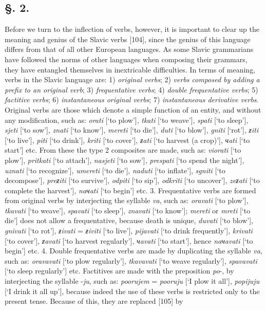 \subsection*{\hspace*{\fill}§. 2.\hspace*{\fill}}

Before we turn to the inflection of verbs, however, it is important to clear up the meaning and genius of the Slavic verbs [104], since the genius of this language differs from that of all other European languages. As some Slavic grammarians have followed the norms of other languages when composing their grammars, they have entangled themselves in inextricable difficulties. In terms of meaning, verbs in the Slavic language are: 1) \textit{original verbs}; 2) \textit{verbs composed by adding a prefix to an original verb}; 3) \textit{frequentative verbs}; 4) \textit{double frequentative verbs}; 5) \textit{factitive verbs}; 6) \textit{instantaneous original verbs}; 7) \textit{instantaneous derivative verbs}. Original verbs are those which denote a simple function of an entity, and without any modification, such as: \textit{orati} [‘to plow’], \textit{tkati} [‘to weave’], \textit{spati} [‘to sleep’], \textit{sjeti} [‘to sow’], \textit{znati} [‘to know’], \textit{mereti} [‘to die’], \textit{duti} [‘to blow’], \textit{gniti} [‘rot’], \textit{ƶiti} [‘to live’], \textit{piti} [‘to drink’], \textit{kriti} [‘to cover’], \textit{ƶati} [‘to harvest (a crop)’], \textit{чati} [‘to start’] etc. From these the type 2 composites are made, such as: \textit{viorati} [‘to plow’], \textit{pritkati} [‘to attach’], \textit{nasjeti} [‘to sow’], \textit{prespati} [‘to spend the night’], \textit{uznati} [‘to recognize’], \textit{umereti} [‘to die’], \textit{naduti} [‘to inflate’], \textit{sgniti} [‘to decompose’], \textit{preƶiti} [‘to survive’], \textit{odpiti} [‘to sip’], \textit{odkriti} [‘to uncover’], \textit{zeƶati} [‘to complete the harvest’], \textit{naчati} [‘to begin’] etc. 3. Frequentative verbs are formed from original verbs by interjecting the syllable \textit{va}, such as: \textit{oravati} [‘to plow’], \textit{tkavati} [‘to weave’], \textit{spavati} [‘to sleep’], \textit{znavati} [‘to know’]; \textit{mereti} or \textit{mreti} [‘to die’] does not allow a frequentative, because death is unique, \textit{duvati} [‘to blow’], \textit{gnivati} [‘to rot’], \textit{ƶivati} = \textit{ƶiviti} [‘to live’], \textit{pijavati} [‘to drink frequently’], \textit{krivati} [‘to cover’], \textit{ƶavati} [‘to harvest regularly’], \textit{чavati} [‘to start’], hence \textit{naчavati} [‘to begin’] etc. 4. Double frequentative verbs are made by duplicating the syllable \textit{va}, such as: \textit{oravavati} [‘to plow regularly’], \textit{tkavavati} [‘to weave regularly’], \textit{spavavati} [‘to sleep regularly’] etc. Factitives are made with the preposition \textit{po}-, by interjecting the syllable -\textit{ju}, such as: \textit{poorujem} = \textit{pooruju} [‘I plow it all’], \textit{popijuju} [‘I drink it all up’], because indeed the use of these verbs is restricted only to the present tense. Because of this, they are replaced [105] by 